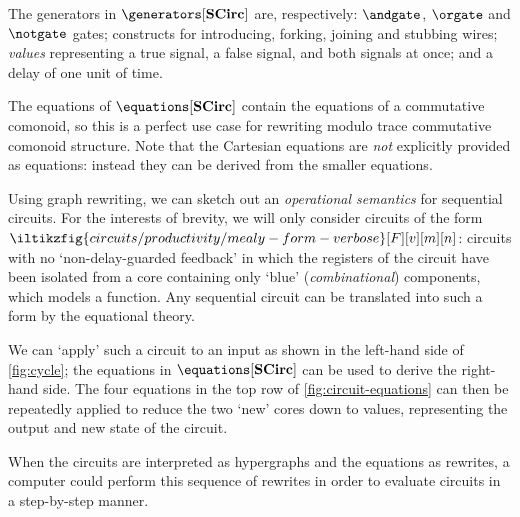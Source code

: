 



The generators in \(\generators[\mathbf{SCirc}]\) are, respectively:
\(\andgate\), \(\orgate\) and \(\notgate\) gates; constructs for introducing,
forking, joining and stubbing wires; \emph{values} representing a true signal,
a false signal, and both signals at once; and a delay of one unit of time.

The equations of \(\equations[\mathbf{SCirc}]\) contain the equations of a
commutative comonoid, so this is a perfect use case for rewriting modulo
trace commutative comonoid structure.
Note that the Cartesian equations are \emph{not} explicitly provided as
equations: instead they can be derived from the smaller equations.

Using graph rewriting, we can sketch out an \emph{operational semantics} for
sequential circuits.
For the interests of brevity, we will only consider circuits of the form \(
    \iltikzfig{circuits/productivity/mealy-form-verbose}[F][v][m][n]
\): circuits with no `non-delay-guarded feedback' in which the registers of the
circuit have been isolated from a core containing only `blue'
(\emph{combinational}) components, which models a function.
Any sequential circuit can be translated into such a form by the equational
theory.

We can `apply' such a circuit to an input as shown in the left-hand side of
\cref{fig:cycle}; the equations in
\(\equations[\mathbf{SCirc}]\) can be used to derive the right-hand side.
The four equations in the top row of \cref{fig:circuit-equations} can then be
repeatedly applied to reduce the two `new' cores down to values, representing
the output and new state of the circuit.

When the circuits are interpreted as hypergraphs and the equations as rewrites,
a computer could perform this sequence of rewrites in order to evaluate circuits
in a step-by-step manner.
